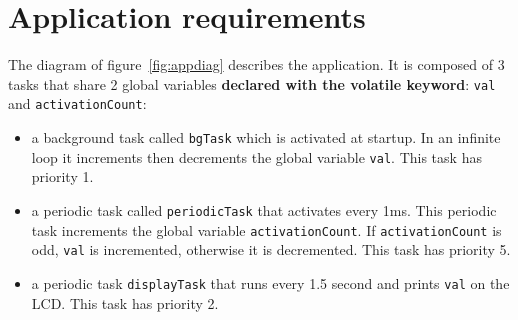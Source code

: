 \documentclass[11pt]{report}
\begin{document}
\section{Application requirements}

The diagram of figure~\ref{fig:appdiag} describes the application.
It is composed of 3 tasks that share 2 global variables {\bf declared with the volatile keyword}: \texttt{val} and \texttt{activationCount}:
\begin{itemize}
\item a background task called \texttt{bgTask} which is activated at startup. In an infinite loop it increments then decrements the global variable \texttt{val}. This task has priority 1.
\item a periodic task called \texttt{periodicTask} that activates every 1ms. This periodic task increments the global variable \texttt{activationCount}. If \texttt{activationCount} is odd, \texttt{val} is incremented, otherwise it is decremented. This task has priority 5.
\item a periodic task \texttt{displayTask} that runs every 1.5 second and prints \texttt{val} on the LCD. This task has priority 2.
\end{itemize}

\def\alarm#1#2{
  \node[alarm](#1) [#2] {};
  \coordinate (a) at ($(#1.north)$);
  \coordinate (b) at ($(#1.north east)$);
  \coordinate (c) at ($(#1.north west)$);
  \coordinate (d) at ($(#1)$);
  \draw[thick] ($(a)+(-0.1,0)$) rectangle ($(a)+(0.1,0.1)$);
  \draw[rotate=-45,thick] ($(b)+(-0.05,0)$) rectangle ($(b)+(0.05,0.1)$);
  \draw[rotate=45,thick] ($(c)+(-0.05,0)$) rectangle ($(c)+(0.05,0.1)$);
  \draw ($(d)+(0.3,0)$) -- (d) -- ($(d)+(0,0.3)$);
  \node [font=\scriptsize,below=0.5mm of #1] {{\em Alarm}}
}

\def\sharedvar#1#2#3{
  \node (#1) [#2] {#1};
  \coordinate (a) at ($(#1.north #3) + (0,0.2)$);
  \coordinate (b) at ($(#1.south #3) + (0,-0.2)$);
  \draw[ultra thick] (a) -- (b);
  \draw ($(a)+(-0.1,0)$) -- ($(a)+(0.1,0)$);
  \draw ($(b)+(-0.1,0)$) -- ($(b)+(0.1,0)$)
}

\def\varrect#1{
  \draw ($(#1.south west)$) rectangle ($(#1.north east)$)
}
\end{document}
